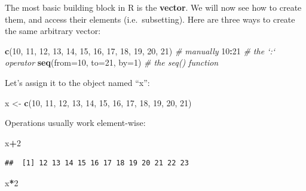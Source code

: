 \documentclass[]{book}
\newenvironment{Shaded}{\begin{snugshade}}{\end{snugshade}}
\newcommand{\CommentTok}[1]{\textcolor[rgb]{0.56,0.35,0.01}{\textit{#1}}}
\newcommand{\DataTypeTok}[1]{\textcolor[rgb]{0.13,0.29,0.53}{#1}}
\newcommand{\DecValTok}[1]{\textcolor[rgb]{0.00,0.00,0.81}{#1}}
\newcommand{\KeywordTok}[1]{\textcolor[rgb]{0.13,0.29,0.53}{\textbf{#1}}}
\newcommand{\NormalTok}[1]{#1}
\newcommand{\OperatorTok}[1]{\textcolor[rgb]{0.81,0.36,0.00}{\textbf{#1}}}
\newcommand{\StringTok}[1]{\textcolor[rgb]{0.31,0.60,0.02}{#1}}
\theoremstyle{definition}
\theoremstyle{definition}
\theoremstyle{definition}
\theoremstyle{remark}
\begin{document}
The most basic building block in R is the \textbf{vector}.
We will now see how to create them, and access their elements (i.e.~subsetting).
Here are three ways to create the same arbitrary vector:

\begin{Shaded}
\begin{Highlighting}[]
\KeywordTok{c}\NormalTok{(}\DecValTok{10}\NormalTok{, }\DecValTok{11}\NormalTok{, }\DecValTok{12}\NormalTok{, }\DecValTok{13}\NormalTok{, }\DecValTok{14}\NormalTok{, }\DecValTok{15}\NormalTok{, }\DecValTok{16}\NormalTok{, }\DecValTok{17}\NormalTok{, }\DecValTok{18}\NormalTok{, }\DecValTok{19}\NormalTok{, }\DecValTok{20}\NormalTok{, }\DecValTok{21}\NormalTok{) }\CommentTok{# manually}
\DecValTok{10}\OperatorTok{:}\DecValTok{21} \CommentTok{# the `:` operator                            }
\KeywordTok{seq}\NormalTok{(}\DataTypeTok{from=}\DecValTok{10}\NormalTok{, }\DataTypeTok{to=}\DecValTok{21}\NormalTok{, }\DataTypeTok{by=}\DecValTok{1}\NormalTok{) }\CommentTok{# the seq() function}
\end{Highlighting}
\end{Shaded}

Let's assign it to the object named ``x'':

\begin{Shaded}
\begin{Highlighting}[]
\NormalTok{x <-}\StringTok{ }\KeywordTok{c}\NormalTok{(}\DecValTok{10}\NormalTok{, }\DecValTok{11}\NormalTok{, }\DecValTok{12}\NormalTok{, }\DecValTok{13}\NormalTok{, }\DecValTok{14}\NormalTok{, }\DecValTok{15}\NormalTok{, }\DecValTok{16}\NormalTok{, }\DecValTok{17}\NormalTok{, }\DecValTok{18}\NormalTok{, }\DecValTok{19}\NormalTok{, }\DecValTok{20}\NormalTok{, }\DecValTok{21}\NormalTok{)  }
\end{Highlighting}
\end{Shaded}

Operations usually work element-wise:

\begin{Shaded}
\begin{Highlighting}[]
\NormalTok{x}\OperatorTok{+}\DecValTok{2}
\end{Highlighting}
\end{Shaded}

\begin{verbatim}
##  [1] 12 13 14 15 16 17 18 19 20 21 22 23
\end{verbatim}

\begin{Shaded}
\begin{Highlighting}[]
\NormalTok{x}\OperatorTok{*}\DecValTok{2}    
\end{Highlighting}
\end{Shaded}
\end{document}
